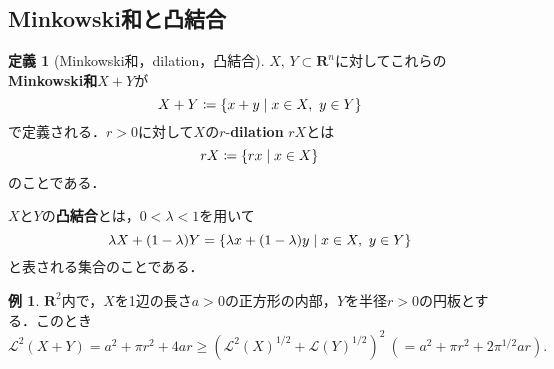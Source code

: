 \documentclass[a4j]{ltjsarticle}
\newcommand{\Rset}{\mathbf{R}}
\newcommand{\Lm}{\mathcal{L}}
\newcommand{\1}{\bm{1}}
\numberwithin{equation}{section}
\theoremstyle{definition}
\newtheorem{dfn}[thm]{定義}
\newtheorem{eg}[thm]{例}
\begin{document}
\subsection{Minkowski和と凸結合}
\begin{dfn}[Minkowski和，dilation，凸結合]
$X,\,Y\subset \Rset^n$に対してこれらの\textbf{Minkowski和}$X+Y$が
    \begin{equation}
        X+Y\coloneqq \qty{x+y\mid x\in X,\ y\in Y}
    \end{equation}
    で定義される．$r>0$に対して$X$の$r$-\textbf{dilation} $rX$とは 
    \begin{equation}
        rX\coloneqq \qty{rx\mid x\in X}
    \end{equation}
    のことである．
    
    $X$と$Y$の\textbf{凸結合}とは，$0<\lambda<1$を用いて
    \begin{equation}
        \lambda X+(1-\lambda)Y=\qty{\lambda x+(1-\lambda )y\mid x\in X,\ y\in Y}
    \end{equation}
    と表される集合のことである．
\end{dfn}
\begin{eg}
    $\Rset^2$内で，$X$を1辺の長さ$a>0$の正方形の内部，$Y$を半径$r>0$の円板とする．このとき
    \begin{equation}
        \Lm^2(X+Y)=a^2+\pi r^2+4ar\geq (\Lm^2(X)^{1/2}+\Lm(Y)^{1/2})^{2}\ (=a^2+\pi r^2+2\pi^{1/2}ar).
    \end{equation}
\end{eg}
\end{document}

